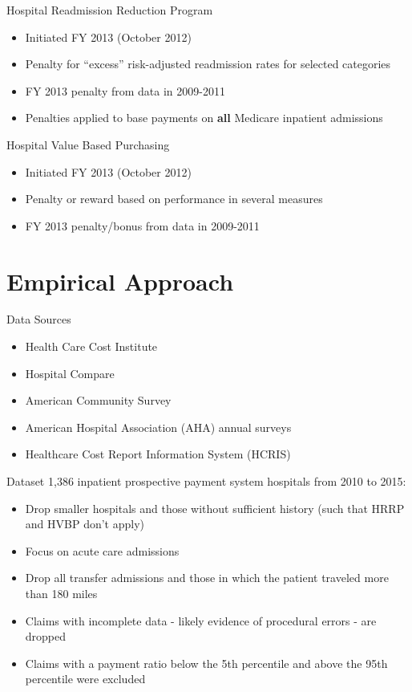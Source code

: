 \documentclass[t]{beamer}
\begin{document}
\begin{frame}{Hospital Readmission Reduction Program}
    \begin{itemize}
        \item Initiated FY 2013 (October 2012)
        \item Penalty for ``excess'' risk-adjusted readmission rates for selected categories
        \item FY 2013 penalty from data in 2009-2011
        \item Penalties applied to base payments on \textbf{all} Medicare inpatient admissions
    \end{itemize}
\end{frame}

\begin{frame}{Hospital Value Based Purchasing}
    \begin{itemize}
        \item Initiated FY 2013 (October 2012)
        \item Penalty or reward based on performance in several measures
        \item FY 2013 penalty/bonus from data in 2009-2011
    \end{itemize}
\end{frame}


\section{Empirical Approach}
\begin{frame}{Data Sources}
    \begin{itemize}
        \item Health Care Cost Institute
        \item Hospital Compare
        \item American Community Survey
        \item American Hospital Association (AHA) annual surveys
        \item Healthcare Cost Report Information System (HCRIS)
    \end{itemize}
\end{frame}

\begin{frame}{Dataset}
    1,386 inpatient prospective payment system hospitals from 2010 to 2015:
    \begin{itemize}
        \item Drop smaller hospitals and those without sufficient history (such that HRRP and HVBP don't apply)
        \item Focus on acute care admissions
        \item Drop all transfer admissions and those in which the patient traveled more than 180 miles
        \item Claims with incomplete data - likely evidence of procedural errors - are dropped
        \item Claims with a payment ratio below the 5th percentile and above the 95th percentile were excluded
    \end{itemize}
\end{frame}
\end{document}
